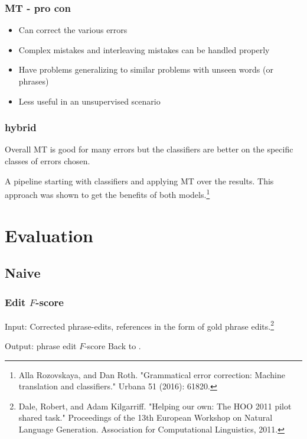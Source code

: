 \documentclass{beamer}
\newcommand*\pooritem{%
	\item[\color{red}\scalebox{0.9}{\textbullet}]}
\newcommand*\gooditem{%
	\item[\color{blue}\scalebox{0.9}{\textbullet}]}
\begin{document}
\begin{frame}
	\frametitle{MT - pro con}
	\begin{itemize}
		\gooditem Can correct the various errors
		\gooditem Complex mistakes and interleaving mistakes can be handled properly
		\pooritem Have problems generalizing to similar problems with unseen words (or phrases)
		\pooritem Less useful in an unsupervised scenario
	\end{itemize}
\end{frame}

\begin{frame}
	\frametitle{hybrid}
	Overall MT is good for many errors but the classifiers are better on the specific classes of errors chosen.
	
	A pipeline starting with classifiers and applying MT over the results.
	This approach was shown to get the benefits of both models.\footnote{\tiny Alla Rozovskaya, and Dan Roth. "Grammatical error correction: Machine translation and classifiers." Urbana 51 (2016): 61820.}
\end{frame}

\section{Evaluation}
\subsection{Naive}
\begin{frame}[label=fscore]
	\frametitle{Edit $F$-score}
	Input: Corrected phrase-edits, references in the form of gold phrase edits.\footnote{\tiny Dale, Robert, and Adam Kilgarriff. "Helping our own: The HOO 2011 pilot shared task." Proceedings of the 13th European Workshop on Natural Language Generation. Association for Computational Linguistics, 2011.}
	
	Output: phrase edit $F$-score 
	\small Back to \hyperlink{RBM}{}.
\end{frame}
\end{document}

